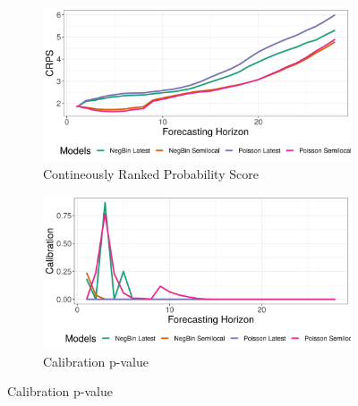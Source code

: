 \begin{figure}[H]
\begin{subfigure}{0.5\textwidth}
  \centering
  \includegraphics[width=\linewidth]{../output/national_crps.png}  
  \caption{Contineously Ranked Probability Score}
  \label{national_scores_1}
\end{subfigure}
\begin{subfigure}{0.5\textwidth}
  \centering
  \includegraphics[width=\linewidth]{../output/national_calibration.png}  
  \caption{Calibration p-value}
  \label{national_scores_2}
\end{subfigure}


\end{figure}
